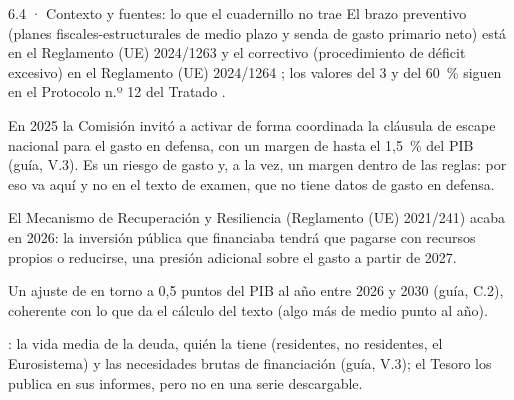\begin{complemento}{6.4 · Contexto y fuentes: lo que el cuadernillo no trae}
 El brazo preventivo (planes fiscales-estructurales de medio plazo y senda de gasto primario neto) está en el Reglamento (UE) 2024/1263 \parencite{UE2024Reglamento1263} y el correctivo (procedimiento de déficit excesivo) en el Reglamento (UE) 2024/1264 \parencite{UE2024Reglamento1264}; los valores del 3 y del 60~\% siguen en el Protocolo n.º 12 del Tratado \parencite{TFUE2012Protocolo12}.

 En 2025 la Comisión invitó a activar de forma coordinada la cláusula de escape nacional para el gasto en defensa, con un margen de hasta el 1,5~\% del PIB \parencite{CE2025Defensa} (guía, V.3). Es un riesgo de gasto y, a la vez, un margen dentro de las reglas: por eso va aquí y no en el texto de examen, que no tiene datos de gasto en defensa.

 El Mecanismo de Recuperación y Resiliencia (Reglamento (UE) 2021/241) acaba en 2026: la inversión pública que financiaba tendrá que pagarse con recursos propios o reducirse, una presión adicional sobre el gasto a partir de 2027.

 Un ajuste de en torno a 0,5 puntos del PIB al año entre 2026 y 2030 \parencite{FMI2026ArticuloIV} (guía, C.2), coherente con lo que da el cálculo del texto (algo más de medio punto al año).

: la vida media de la deuda, quién la tiene (residentes, no residentes, el Eurosistema) y las necesidades brutas de financiación (guía, V.3); el Tesoro los publica en sus informes, pero no en una serie descargable.
\end{complemento}

